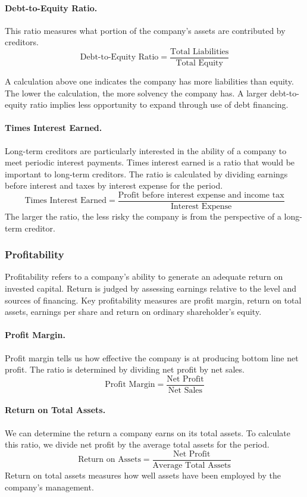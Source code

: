 \documentclass[../main.tex]{subfiles}
\begin{document}
	\paragraph{Debt-to-Equity Ratio.} This ratio measures what portion of the 
	company's assets are contributed by creditors. 
	\[
	\text{Debt-to-Equity Ratio} = \frac{\text{Total Liabilities}}{\text{Total 
	Equity}}
	\]
	
	A calculation above one indicates the 
	company has more liabilities than equity. The lower the calculation, the 
	more solvency the company has. A larger debt-to-equity ratio implies less 
	opportunity to expand through use of debt financing.
	
	\paragraph{Times Interest Earned.} Long-term creditors are particularly 
	interested in the ability of a company to meet periodic interest payments. 
	Times interest earned is a ratio that would be important to long-term 
	creditors.  The ratio is calculated by dividing earnings before interest 
	and taxes by interest expense for the period. 
	\[
	\text{Times Interest Earned} = \frac{\text{Profit before interest expense 
	and income tax}}{\text{Interest Expense}}
	\]
	The larger the ratio, the less risky the company is from the perspective of 
	a long-term creditor.
	
	\subsubsection{Profitability}
	
	Profitability refers to a company’s ability to generate an adequate return 
	on invested capital. Return is judged by assessing earnings relative to the 
	level and sources of financing. Key profitability measures are profit 
	margin, return on total assets, earnings per share and return on ordinary 
	shareholder’s equity.  
	
	\paragraph{Profit Margin.} Profit margin tells us how effective the company 
	is at producing bottom line net profit.  The ratio is determined by 
	dividing net profit by net sales.
	\[
	\text{Profit Margin} = \frac{\text{Net Profit}}{\text{Net Sales}}
	\] 
	
	\paragraph{Return on Total Assets.} We can determine the return a company 
	earns on its total assets.  To 
	calculate this ratio, we divide net profit by the average total assets for 
	the period. 
	\[
	\text{Return on Assets} = \frac{\text{Net Profit}}{\text{Average Total 
	Assets}}
	\]
	Return on total assets measures how well assets have been 
	employed by the company’s management. 
	
\end{document}
